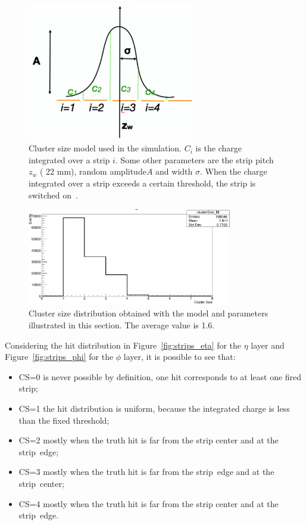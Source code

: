 \begin{figure}[!h]
	\centering
	\includegraphics[width=0.65\textwidth]{Chapters/CH3/figures/csm_pic}
	\caption{Cluster size model used in the simulation. $C_i$ is the charge integrated over a strip $i$. 
		Some other parameters are the strip pitch $z_w$ ( 22 mm), random amplitude$A$ and width $\sigma$. When the charge integrated over a strip exceeds a certain threshold, the strip is switched on~\cite{MuonWeek22Oct}.}
	\label{fig:csm_pic}
\end{figure}
\begin{figure}[!h]
	\centering
	\includegraphics[width=0.8\textwidth]{Chapters/CH3/figures/CS}
	\caption{Cluster size distribution obtained with the model and parameters illustrated in this section. The average value is 1.6.}
	\label{fig:CS}
\end{figure}
\newpage\phantom{}
\noindent Considering the hit distribution in Figure~\ref{fig:strips_eta} for the $\eta$ layer and Figure~\ref{fig:strips_phi} for the $\phi$ layer, it is possible to see that:
\begin{itemize}
\item CS=0 is never possible by definition, one hit corresponds to at least one fired strip;
\item CS=1 the hit distribution is uniform, because the integrated charge is less than the fixed threshold;
\item CS=2 mostly when the truth hit is far from the strip center and at the strip~edge;
\item CS=3 mostly when the truth hit is far from the strip~edge and at the strip~center;
\item CS=4 mostly when the truth hit is far from the strip center and at the strip~edge.
\end{itemize}

